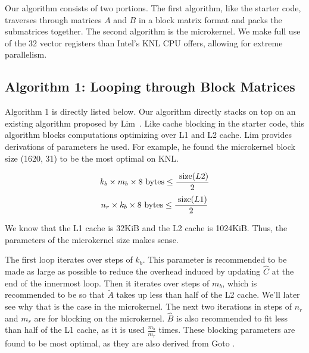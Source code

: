 \documentclass{article}
\begin{document}
Our algorithm consists of two portions. The first algorithm, like the starter code, traverses through matrices $A$ and $B$ in a block matrix format and packs the submatrices together. The second algorithm is the microkernel. We make full use of the 32 vector registers than Intel's KNL CPU offers, allowing for extreme parallelism. 

\subsection{Algorithm 1: Looping through Block Matrices}
\label{sec:blockalg}
Algorithm 1 is directly listed below. Our algorithm directly stacks on top on an existing algorithm proposed by Lim~\cite{10.1007/s10586-018-2810-y}. Like cache blocking in the starter code, this algorithm blocks computations optimizing over L1 and L2 cache. Lim provides derivations of parameters he used. For example, he found the microkernel block size (1620, 31) to be the most optimal on KNL. 

$$k_b \times m_b \times 8 \textnormal{ bytes} \leq \frac{\textnormal{ size}(L2)}{2}$$
$$n_r \times k_b \times 8 \textnormal{ bytes} \leq \frac{\textnormal{ size}(L1)}{2}$$

We know that the L1 cache is 32KiB and the L2 cache is 1024KiB. Thus, the parameters of the microkernel size makes sense.

The first loop iterates over steps of $k_b$. This parameter is recommended to be made as large as possible to reduce the overhead induced by updating $\hat{C}$ at the end of the innermost loop. Then it iterates over steps of $m_b$, which is recommended to be so that $\tilde{A}$ takes up less than half of the L2 cache. We'll later see why that is the case in the microkernel. The next two iterations in steps of $n_r$ and $m_r$ are for blocking on the microkernel. $\hat{B}$ is also recommended to fit less than half of the L1 cache, as it is used $\frac{m_b}{m_r}$ times. These blocking parameters are found to be most optimal, as they are also derived from Goto \cite{10.1145/1356052.1356053}.
\end{document}
